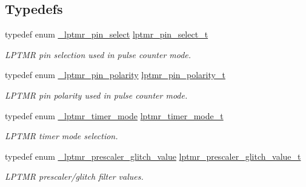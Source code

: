 \subsection*{Typedefs}
\begin{DoxyCompactItemize}
\item 
\mbox{\label{group__lptmr_ga37c4ca922036c3e0e5af194799d3cfad}} 
typedef enum \mbox{\hyperlink{group__lptmr_gad7812eb27238f5bd2cb3edc40d5f25ed}{\+\_\+lptmr\+\_\+pin\+\_\+select}} \mbox{\hyperlink{group__lptmr_ga37c4ca922036c3e0e5af194799d3cfad}{lptmr\+\_\+pin\+\_\+select\+\_\+t}}
\begin{DoxyCompactList}\small\item\em L\+P\+T\+MR pin selection used in pulse counter mode. \end{DoxyCompactList}\item 
\mbox{\label{group__lptmr_gaa2ac38a4cb3ac1cfb704baec44f4174c}} 
typedef enum \mbox{\hyperlink{group__lptmr_ga9bd2404c984ac5eea420a396e7cdda77}{\+\_\+lptmr\+\_\+pin\+\_\+polarity}} \mbox{\hyperlink{group__lptmr_gaa2ac38a4cb3ac1cfb704baec44f4174c}{lptmr\+\_\+pin\+\_\+polarity\+\_\+t}}
\begin{DoxyCompactList}\small\item\em L\+P\+T\+MR pin polarity used in pulse counter mode. \end{DoxyCompactList}\item 
\mbox{\label{group__lptmr_ga507b12d91dad8bbc571b4d651d3a17c2}} 
typedef enum \mbox{\hyperlink{group__lptmr_ga40237256921d8a780c71b2f4ce162498}{\+\_\+lptmr\+\_\+timer\+\_\+mode}} \mbox{\hyperlink{group__lptmr_ga507b12d91dad8bbc571b4d651d3a17c2}{lptmr\+\_\+timer\+\_\+mode\+\_\+t}}
\begin{DoxyCompactList}\small\item\em L\+P\+T\+MR timer mode selection. \end{DoxyCompactList}\item 
\mbox{\label{group__lptmr_gad3d903364803228c64b5b650c2624ac0}} 
typedef enum \mbox{\hyperlink{group__lptmr_gad4e93a569a14f82f31f9cac1582daddd}{\+\_\+lptmr\+\_\+prescaler\+\_\+glitch\+\_\+value}} \mbox{\hyperlink{group__lptmr_gad3d903364803228c64b5b650c2624ac0}{lptmr\+\_\+prescaler\+\_\+glitch\+\_\+value\+\_\+t}}
\begin{DoxyCompactList}\small\item\em L\+P\+T\+MR prescaler/glitch filter values. \end{DoxyCompactList}\item 

\end{DoxyCompactItemize}
